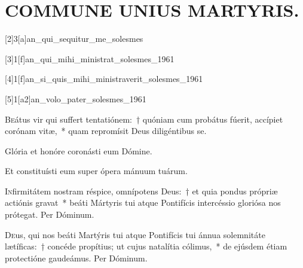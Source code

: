 \documentclass[vesperale_romanum.tex]{subfiles}
\begin{document}
\section[Commune Unius Martyris]{COMMUNE UNIUS MARTYRIS.}




[2]{3}[a]{an_qui_sequitur_me_solesmes}

[3]{1}[f]{an_qui_mihi_ministrat_solesmes_1961}

[4]{1}[f]{an_si_quis_mihi_ministraverit_solesmes_1961}

[5]{1}[a2]{an_volo_pater_solesmes_1961}

\label{cap_commune_unius_martyris}
{}

\lettrine{B}{e}átus vir qui suffert tentatiónem:~† quóniam cum probátus fúerit, accípiet corónam vitæ,~* quam repromísit Deus diligéntibus se.

\hymnus

\label{hy_deus_tuorum_militum_solesmes_1961}


\altertonus


\vv Glória et honóre coronásti eum Dómine.

\rr Et constituísti eum super ópera mánuum tuárum.

\admagnificat
{}


\lettrine{I}{n}firmitátem nostram réspice, omnípotens Deus:~† et quia pondus própriæ actiónis gravat~* beáti  \nomen{} Mártyris tui atque Pontifícis intercéssio gloriósa nos prótegat. Per Dóminum.

\aliaoratio

\lettrine{D}{e}us, qui nos beáti  \nomen{} Martýris tui atque Pontifícis tui ánnua sole\-mnitáte lætíficas:~† concéde propítius; ut cujus natalítia cólimus,~* de ejúsdem étiam prote\-ctióne gaudeámus. Per Dóminum.
\end{document}

